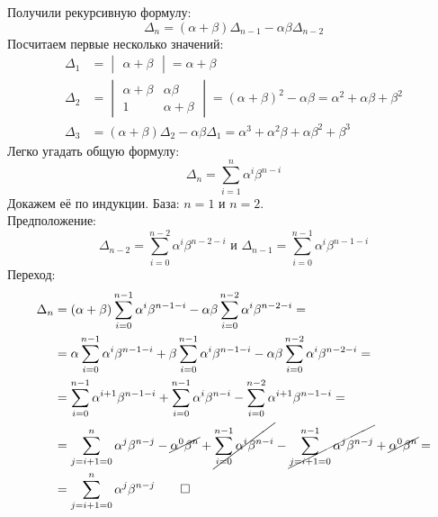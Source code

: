 \documentclass[11pt, letter, utf-8]{article}
\begin{document}
    Получили рекурсивную формулу:
    \[\Delta_{n} = (\alpha + \beta) \Delta_{n-1} - \alpha \beta \Delta_{n-2}\]
    Посчитаем первые несколько значений:
    \begin{align*}
        \Delta _1 &= \begin{vmatrix}
            \alpha + \beta
        \end{vmatrix} = \alpha + \beta \\
        \Delta _2 &= \begin{vmatrix}
            \alpha + \beta & \alpha \beta \\
            1 & \alpha + \beta
        \end{vmatrix} = (\alpha + \beta)^2 - \alpha \beta = \alpha ^ 2 + \alpha \beta + \beta ^2 \\
        \Delta _3 &= (\alpha + \beta)\Delta_2 - \alpha \beta \Delta_1 = \alpha ^3 + \alpha ^2 \beta + \alpha \beta^2 + \beta^3
    \end{align*}
    Легко угадать общую формулу:
    \[\Delta_{n} = \sum_{i = 1}^n \alpha ^i \beta ^{n-i}\]
    Докажем её по индукции. База: $n = 1$ и $n = 2$.\\
    Предположение:
    \[\Delta_{n-2} =\sum_{i = 0}^{n-2} \alpha^i \beta^{n-2-i} \text{ и } \Delta_{n-1} =\sum_{i = 0}^{n-1} \alpha^i \beta^{n-1-i}\]
    Переход:
    \begin{align*}
        \Delta_n &= (\alpha + \beta) \sum_{i = 0}^{n-1}\alpha^i \beta^{n-1-i} - \alpha \beta \sum_{i = 0}^{n-2}\alpha^i \beta^{n-2-i} = \\
        &= \alpha \sum_{i = 0}^{n-1}\alpha^i \beta^{n-1-i} + \beta \sum_{i = 0}^{n-1}\alpha^i \beta^{n-1-i} - \alpha \beta \sum_{i = 0}^{n-2}\alpha^i \beta^{n-2-i} = \\
        &= \sum_{i = 0}^{n-1}\alpha^{i+1} \beta^{n-1-i} + \sum_{i = 0}^{n-1}\alpha^i \beta^{n-i} - \sum_{i = 0}^{n-2}\alpha^{i+1} \beta^{n-1-i} = \\
        &= \sum_{j = i+1 = 0}^{n}\alpha^{j} \beta^{n-j} - \cancel{\alpha^0 \beta^n} + \cancel{\sum_{i = 0}^{n-1}\alpha^i \beta^{n-i}} - \cancel{\sum_{j = i+1 = 0}^{n-1}\alpha^{j} \beta^{n-j}} + \cancel{\alpha^0 \beta^n} = \\
        &= \sum_{j = i+1 = 0}^{n}\alpha^{j} \beta^{n-j} \qed
    \end{align*}
\end{document}
